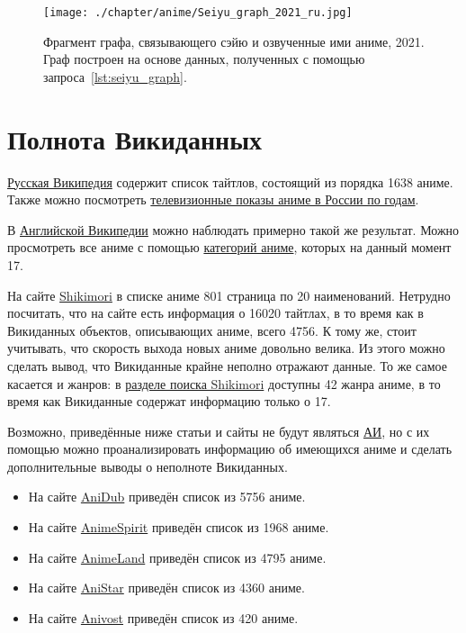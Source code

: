 \begin{figure*}[h]
	\texttt{[image: ./chapter/anime/Seiyu\_graph\_2021\_ru.jpg]}
	\caption[Фрагмент графа, связывающего сэйю и озвученные ими аниме, 2021.]{Фрагмент графа, связывающего сэйю и озвученные ими аниме, 2021. Граф построен на основе данных, полученных с помощью запроса~\protect\ref{lst:seiyu_graph}.}%
      \label{fig:Seiyu_graph_2021_ru}%
\end{figure*} 

\section{Полнота Викиданных}

\href{https://clck.ru/YTPf9}{Русская Википедия} содержит список тайтлов, состоящий из порядка \num{1638} аниме. Также можно посмотреть \href{https://clck.ru/YTPgk}{телевизионные показы аниме в России по годам}.

В \href{https://en.wikipedia.org/wiki/Lists_of_anime}{Английской Википедии} можно наблюдать примерно такой же результат. Можно просмотреть все аниме с помощью \href{https://en.wikipedia.org/wiki/Category:Lists_of_anime_by_genre}{категорий аниме}, которых на данный момент \num{17}.

На сайте \href{https://shikimori.one/}{Shikimori} в списке аниме \num{801} страница по \num{20} наименований. Нетрудно посчитать, что на сайте есть информация о \num{16020} тайтлах, в то время как в Викиданных объектов, описывающих аниме, всего \num{4756}. К тому же, стоит учитывать, что скорость выхода новых аниме довольно велика. Из этого можно сделать вывод, что Викиданные крайне неполно отражают данные. То же самое касается и жанров: в \href{https://shikimori.one/animes}{разделе поиска Shikimori} доступны \num{42} жанра аниме, в то время как Викиданные содержат информацию только о \num{17}.

Возможно, приведённые ниже статьи и сайты не будут являться \href{https://clck.ru/FLzh8}{АИ}, но с их помощью можно проанализировать информацию об имеющихся аниме и сделать дополнительные выводы о неполноте Викиданных.

\begin{itemize}
	\item На сайте \href{http://online.anidub.best/}{AniDub} приведён список из \num{5756} аниме.
	\item На сайте \href{http://animespirit.tv/}{AnimeSpirit} приведён список из \num{1968} аниме.
	\item На сайте \href{http://animeland.su/}{AnimeLand} приведён список из \num{4795} аниме.
	\item На сайте \href{https://anistar.ew.r.appspot.com/}{AniStar} приведён список из \num{4360} аниме.
	\item На сайте \href{https://anivost.org/}{Anivost} приведён список из \num{420} аниме.
\end{itemize}

